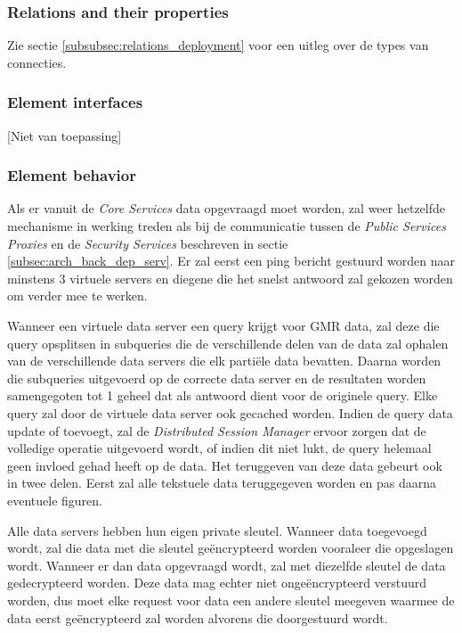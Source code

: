 \documentclass[a4paper,10pt]{article}
\begin{document}
\subsubsection{Relations and their properties}
Zie sectie \ref{subsubsec:relations_deployment} voor een uitleg over de types van connecties.

\subsubsection{Element interfaces}
[Niet van toepassing]

\subsubsection{Element behavior}
\label{subsubsec:dep_data_behavior}
Als er vanuit de \textit{Core Services} data opgevraagd moet worden, zal weer hetzelfde mechanisme in werking treden als bij de communicatie tussen de \textit{Public Services Proxies} en de \textit{Security Services} beschreven in sectie \ref{subsec:arch_back_dep_serv}. Er zal eerst een ping bericht gestuurd worden naar minstens 3 virtuele servers en diegene die het snelst antwoord zal gekozen worden om verder mee te werken.

Wanneer een virtuele data server een query krijgt voor GMR data, zal deze die query opsplitsen in subqueries die de verschillende delen van de data zal ophalen van de verschillende data servers die elk partiële data bevatten. Daarna worden die subqueries uitgevoerd op de correcte data server en de resultaten worden samengegoten tot 1 geheel dat als antwoord dient voor de originele query. Elke query zal door de virtuele data server ook gecached worden. Indien de query data update of toevoegt, zal de \textit{Distributed Session Manager} ervoor zorgen dat de volledige operatie uitgevoerd wordt, of indien dit niet lukt, de query helemaal geen invloed gehad heeft op de data. Het teruggeven van deze data gebeurt ook in twee delen. Eerst zal alle tekstuele data teruggegeven worden en pas daarna eventuele figuren.

Alle data servers hebben hun eigen private sleutel. Wanneer data toegevoegd wordt, zal die data met die sleutel geëncrypteerd worden vooraleer die opgeslagen wordt. Wanneer er dan data opgevraagd wordt, zal met diezelfde sleutel de data gedecrypteerd worden. Deze data mag echter niet ongeëncrypteerd verstuurd worden, dus moet elke request voor data een andere sleutel meegeven waarmee de data eerst geëncrypteerd zal worden alvorens die doorgestuurd wordt.
\end{document}
